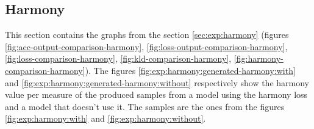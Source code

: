 \documentclass[12pt]{report}
\begin{document}
\subsection{Harmony}
\label{appendix:harmony}

This section contains the graphs from the section \ref{sec:exp:harmony} (figures \ref{fig:acc-output-comparison-harmony}, \ref{fig:loss-output-comparison-harmony}, \ref{fig:loss-comparison-harmony}, \ref{fig:kld-comparison-harmony}, \ref{fig:harmony-comparison-harmony}).
The figures \ref{fig:exp:harmony:generated-harmony:with} and \ref{fig:exp:harmony:generated-harmony:without} respectively show the harmony value per measure of the produced samples from a model using the harmony loss and a model that doesn't use it.
The samples are the ones from the figures \ref{fig:exp:harmony:with} and \ref{fig:exp:harmony:without}.
\end{document}
